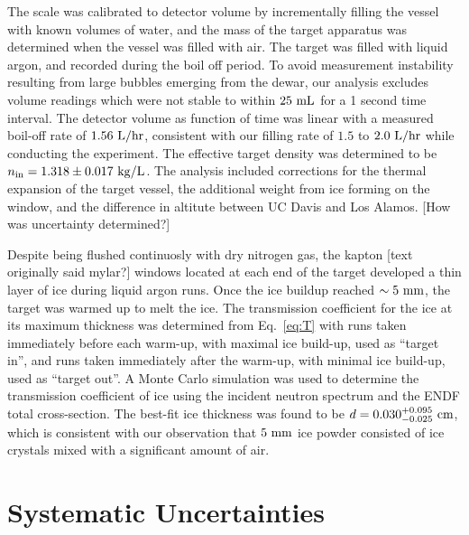 \documentclass[%
 reprint,
superscriptaddress,
 preprintnumbers,
 nofootinbib,
 nobibnotes,
 bibnotes,
 amsmath,amssymb,
 aps,
 prl, 
 floatfix,
]{revtex4-1}
\begin{document}
The scale was calibrated to detector volume by incrementally filling
the vessel with known volumes of water, and the mass of the target
apparatus was determined when the vessel was filled with air.  The
target was filled with liquid argon, and recorded during the boil off
period.  To avoid measurement instability resulting from large bubbles
emerging from the dewar, our analysis excludes volume readings which
were not stable to within $25~\rm mL$ for a 1 second time interval.
The detector volume as function of time was linear with a measured
boil-off rate of $1.56~\rm L/hr$, consistent with our filling rate of
$1.5$ to $2.0~\rm L/hr$ while conducting the experiment.  The
effective target density was determined to be $n_{\rm in} = 1.318 \pm
0.017~{\rm kg/L}$.  The analysis included corrections for the thermal
expansion of the target vessel, the additional weight from ice forming
on the window, and the difference in altitute between UC Davis and Los
Alamos.  [How was uncertainty determined?]

Despite being flushed continuosly with dry nitrogen gas, the kapton
{\color{red} [text originally said mylar?]} windows located at each
end of the target developed a thin layer of ice during liquid argon
runs.  Once the ice buildup reached $\sim 5~\rm mm$, the target was
warmed up to melt the ice.  The transmission coefficient for the ice
at its maximum thickness was determined from Eq.~\ref{eq:T} with runs
taken immediately before each warm-up, with maximal ice build-up, used
as ``target in'', and runs taken immediately after the warm-up, with
minimal ice build-up, used as ``target out''.  A Monte Carlo
simulation was used to determine the transmission coefficient of ice
using the incident neutron spectrum and the ENDF total cross-section.
The best-fit ice thickness was found to be $d =
0.030^{+0.095}_{-0.025}~\rm cm$, which is consistent with our
observation that $5~\rm mm$ ice powder consisted of ice crystals mixed
with a significant amount of air.

\section{\label{sec:energy}Systematic Uncertainties}
\end{document}
